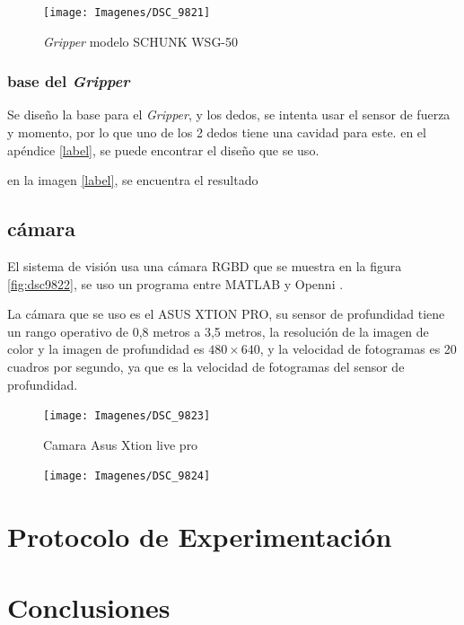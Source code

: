 \begin{figure}
	\centering
	\texttt{[image: Imagenes/DSC\_9821]}
	\caption{\textit{Gripper} modelo SCHUNK WSG-50}
	\label{fig:dsc9821}
\end{figure}

\subsubsection{base del \textit{Gripper}}
Se diseño la base para el \textit{Gripper}, y los dedos, se intenta usar el sensor de fuerza y momento, por lo que uno de los 2 dedos tiene una cavidad para este. en el apéndice \ref{label}, se puede encontrar el diseño que se uso.

en la imagen \ref{label}, se encuentra el resultado




\subsection{cámara}

El sistema de visión usa una cámara RGBD que se muestra en la figura \ref{fig:dsc9822}, se uso un programa entre MATLAB y Openni \cite{matlabwrapper}.

La cámara que se uso es el ASUS XTION PRO, su sensor de profundidad tiene un rango operativo de 0,8 metros a 3,5 metros, la resolución de la imagen de color y la imagen de profundidad es $480 \times640$, y la velocidad de fotogramas es 20 cuadros por segundo, ya que es la velocidad de fotogramas del sensor de profundidad. \\




\begin{figure}
	\centering
	\texttt{[image: Imagenes/DSC\_9823]}
	\caption{Camara Asus Xtion live pro}
	\label{fig:dsc9823}
\end{figure}
\begin{figure}
	\centering
	\texttt{[image: Imagenes/DSC\_9824]}
	\caption{}
	\label{fig:dsc9824}
\end{figure}


\section{Protocolo de Experimentación}

\section{Conclusiones}


